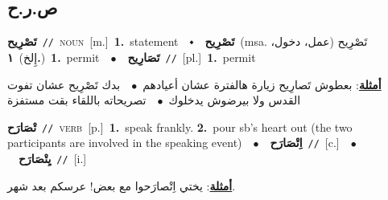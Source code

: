 \documentclass[10pt,a4paper,twoside]{article} %
\begin{document}
\begin{multicols}{2}
\vspace{-3mm}
\subsection*{\color{blue}\foreignlanguage{arabic}{ص.ر.ح}\color{blue}{}} 

{\setlength\topsep{0pt}\textbf{\foreignlanguage{arabic}{تَصْرِيح}}\ {\color{gray}\texttt{//}\color{black}}\ \textsc{noun}\ [m.]\ \textbf{1.}~statement\ \ $\smblkdiamond$\ \ \setlength\topsep{0pt}\textbf{\foreignlanguage{arabic}{تَصْرِيح}}\ \color{gray}(msa. \foreignlanguage{arabic}{تَصْرِيح (عمل، دخول، إِلخ)}~\foreignlanguage{arabic}{\textbf{١.}})\color{black}\ \textbf{1.}~permit\ \ $\bullet$\ \ \setlength\topsep{0pt}\textbf{\foreignlanguage{arabic}{تَصَارِيح}}\ {\color{gray}\texttt{//}\color{black}}\ [pl.]\ \textbf{1.}~permit\  \begin{flushright}\color{gray}\foreignlanguage{arabic}{\textbf{\underline{\foreignlanguage{arabic}{أمثلة}}}: بعطوش تَصارِيح زيارة هالفترة عشان أعيادهم\ $\bullet$\ \  بدك تَصْرِيح عشان تفوت القدس ولا بيرضوش يدخلوك\ $\bullet$\ \  تصريحاته باللقاء بقت مستفزة}\end{flushright}\color{black}} \vspace{2mm}

{\setlength\topsep{0pt}\textbf{\foreignlanguage{arabic}{تْصَارَح}}\ {\color{gray}\texttt{//}\color{black}}\ \textsc{verb}\ [p.]\ \textbf{1.}~speak frankly.  \textbf{2.}~pour sb's heart out (the two participants are involved in the speaking event)\ \ $\bullet$\ \ \setlength\topsep{0pt}\textbf{\foreignlanguage{arabic}{اِتْصَارَح}}\ {\color{gray}\texttt{//}\color{black}}\ [c.]\ \ $\bullet$\ \ \setlength\topsep{0pt}\textbf{\foreignlanguage{arabic}{يِتْصَارَح}}\ {\color{gray}\texttt{//}\color{black}}\ [i.]\  \begin{flushright}\color{gray}\foreignlanguage{arabic}{\textbf{\underline{\foreignlanguage{arabic}{أمثلة}}}: يختي اِتْصارَحوا مع بعض! عرسكم بعد شهر.}\end{flushright}\color{black}} \vspace{2mm}


\end{multicols}
\end{document}
